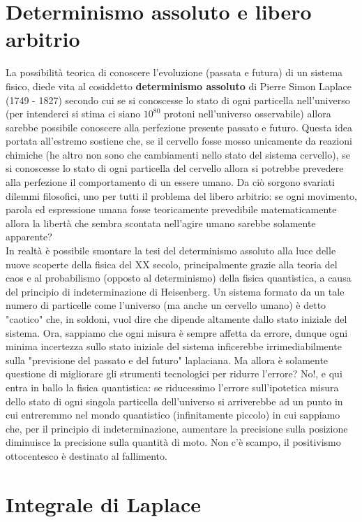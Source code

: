 \documentclass[10pt,a4paper]{article}
\begin{document}
\section{Determinismo assoluto e libero arbitrio}
La possibilità teorica di conoscere l'evoluzione (passata e futura) di un sistema fisico, diede vita al cosiddetto \textbf{determinismo assoluto} di Pierre Simon Laplace (1749 - 1827) secondo cui se si conoscesse lo stato di ogni particella nell'universo (per intenderci si stima ci siano $10^{80}$ protoni nell'universo osservabile) allora sarebbe possibile conoscere alla perfezione presente passato e futuro. Questa idea portata all'estremo sostiene che, se il cervello fosse mosso unicamente da reazioni chimiche (he altro non sono che cambiamenti nello stato del sistema cervello), se si conoscesse lo stato di ogni particella del cervello allora si potrebbe prevedere alla perfezione il comportamento di un essere umano. Da ciò sorgono svariati dilemmi filosofici, uno per tutti il problema del libero arbitrio: se ogni movimento, parola ed espressione umana fosse teoricamente prevedibile matematicamente allora la libertà che sembra scontata nell'agire umano sarebbe solamente apparente?\\
In realtà è possibile smontare la tesi del determinismo assoluto alla luce delle nuove scoperte della fisica del XX secolo, principalmente grazie alla teoria del caos e al probabilismo (opposto al determinismo) della fisica quantistica, a causa del principio di indeterminazione di Heisenberg. Un sistema formato da un tale numero di particelle come l'universo (ma anche un cervello umano) è detto "caotico" che, in soldoni, vuol dire che dipende altamente dallo stato iniziale del sistema. Ora, sappiamo che ogni misura è sempre affetta da errore, dunque ogni minima incertezza sullo stato iniziale del sistema inficerebbe irrimediabilmente sulla "previsione del passato e del futuro" laplaciana. Ma allora è solamente questione di migliorare gli strumenti tecnologici per ridurre l'errore? No!, e qui entra in ballo la fisica quantistica: se riducessimo l'errore sull'ipotetica misura dello stato di ogni singola particella dell'universo si arriverebbe ad un punto in cui entreremmo nel mondo quantistico (infinitamente piccolo) in cui sappiamo che, per il principio di indeterminazione, aumentare la precisione sulla posizione diminuisce la precisione sulla quantità di moto. Non c'è scampo, il positivismo ottocentesco è destinato al fallimento. 
\section{Integrale di Laplace}\label{subsec:laplaceint}
\end{document}
